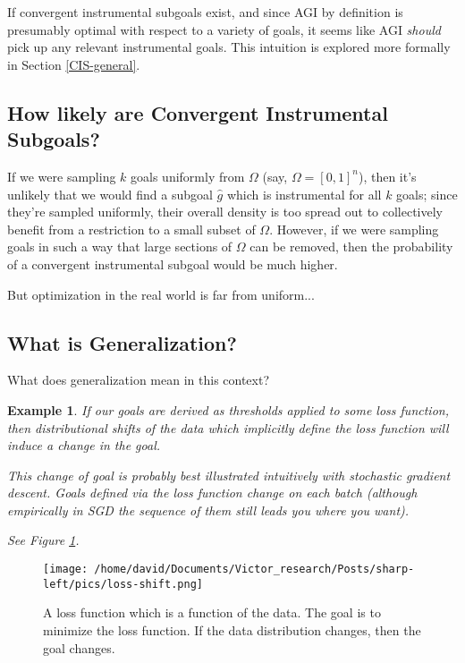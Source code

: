 \documentclass{article}
\newtheorem{example}{Example}
\begin{document}

If convergent instrumental subgoals exist, and since AGI by definition is presumably optimal with respect to a variety of goals, it seems like AGI \emph{should} pick up any relevant instrumental goals. This intuition is explored more formally in Section \ref{CIS-general}.

\subsection{How likely are Convergent Instrumental Subgoals?}
If we were sampling $k$ goals uniformly from $\Omega$ (say, $\Omega=[0,1]^n$), then it's unlikely that we would find a subgoal $\hat{g}$ which is instrumental for all $k$ goals; since they're sampled uniformly, their overall density is too spread out to collectively benefit from a  restriction to a small subset of $\Omega$. However, if we were sampling goals in such a way that large sections of $\Omega$ can be removed, then the probability of a convergent instrumental subgoal would be much higher.

But optimization in the real world is far from uniform...

\subsection{What is Generalization?}
What does generalization mean in this context? 

\begin{example}
If our goals are derived as thresholds applied to some loss function, then distributional shifts of the data which implicitly define the loss function will induce a change in the goal.

This change of goal is probably best illustrated intuitively with stochastic gradient descent. Goals defined via the loss function change on each batch (although empirically in SGD the sequence of them still leads you where you want).

See Figure \ref{fig:loss-shift}.
\end{example}

\begin{figure}[ht]
    \centering
    \texttt{[image: /home/david/Documents/Victor\_research/Posts/sharp-left/pics/loss-shift.png]} 
    \caption{A loss function which is a function of the data. The goal is to minimize the loss function. If the data distribution changes, then the goal changes.}
    \label{fig:loss-shift} 
\end{figure}
\end{document}
